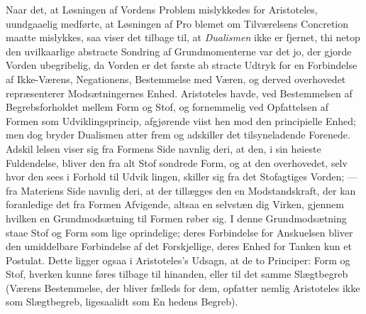 \documentclass[12pt,a4paper]{book}
\begin{document}
Naar det, at Løsningen af Vordens Problem mislykkedes
for Aristoteles, uundgaaelig medførte, at Løsningen af Pro\-%
blemet om Tilværelsens Concretion maatte mislykkes, saa viser
det tilbage til, at \emph{Dualismen} ikke er fjernet, thi netop den
uvilkaarlige abstracte Sondring af Grundmomenterne var det
jo, der gjorde Vorden ubegribelig, da Vorden er det første ab\-%
stracte Udtryk for en Forbindelse af Ikke-Værens, Negationens,
Bestemmelse med Væren, og derved overhovedet repræsenterer
Modsætningernes Enhed. Aristoteles havde, ved Bestemmelsen
af Begrebsforholdet mellem Form og Stof, og fornemmelig ved
Opfattelsen af Formen som Udviklingsprincip, afgjørende viist
hen mod den principielle Enhed; men dog bryder Dualismen
atter frem og adskiller det tilsyneladende Forenede. Adskil\-%
lelsen viser sig fra Formens Side navnlig deri, at den, i sin
høieste Fuldendelse, bliver den fra alt Stof sondrede Form, og
at den overhovedet, selv hvor den sees i Forhold til Udvik\-%
lingen, skiller sig fra det Stofagtiges Vorden; --- fra Materiens
Side navnlig deri, at der tillægges den en Modstandskraft, der
kan foranledige det fra Formen Afvigende, altsaa en selvstæn\-%
dig Virken, gjennem hvilken en Grundmodsætning til Formen
røber sig. I denne Grundmodsætning staae Stof og Form
som lige oprindelige; deres Forbindelse for Anskuelsen bliver
den umiddelbare Forbindelse af det Forskjellige, deres Enhed
for Tanken kun et Postulat. Dette ligger ogsaa i Aristoteles's
Udsagn, at de to Principer: Form og Stof, hverken kunne
føres tilbage til hinanden, eller til det samme Slægtbegreb
(Værens Bestemmelse, der bliver fælleds for dem, opfatter
nemlig Aristoteles ikke som Slægtbegreb, ligesaalidt som En\-%
hedens Begreb).
\end{document}
